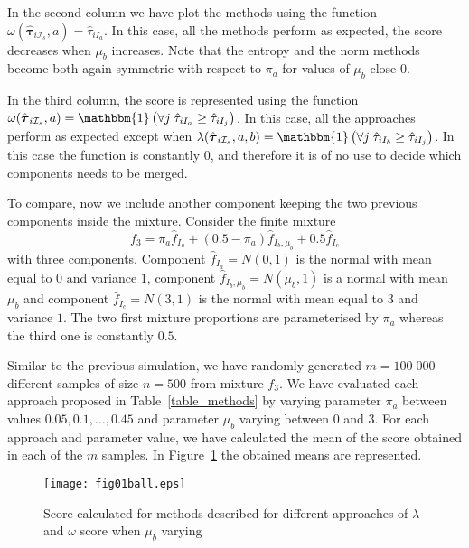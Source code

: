 \documentclass[10pt, a4paper]{article}
\newcommand{\m}[1]{\boldsymbol{#1}}
\begin{document}
In the second column we have plot the methods using the function $\omega(\hat{\m \tau}_{i \mathcal{I}_s}, a) = \hat{\tau}_{iI_a}$. In this case, all the methods perform as expected, the score decreases when $\mu_b$ increases. Note that the entropy and the norm methods become both again symmetric with respect to $\pi_a$ for values of $\mu_b$ close $0$.

In the third column, the score is represented using the function $\omega(\hat{\m \tau}_{i \mathcal{I}_s}, a) = \mathbbm{1}\left( \forall j\; \hat{\tau}_{i I_{a}} \geq \hat{\tau}_{iI_j} \right)$. In this case, all the approaches perform as expected except when $\lambda(\hat{\m \tau}_{i \mathcal{I}_s}, a, b) = \mathbbm{1}\left( \forall j\; \hat{\tau}_{i I_{b}} \geq \hat{\tau}_{iI_j} \right)$. In this case the function is constantly $0$, and therefore it is of no use to decide which components needs to be merged.


To compare, now we include another component keeping the two previous components inside the mixture. Consider the finite mixture
\begin{equation}\label{three_mixture}
f_3 = \pi_a \hat{f}_{I_a} + (0.5 - \pi_a) \hat{f}_{I_b, \mu_b} + 0.5 \hat{f}_{I_c}
\end{equation}
with three components. Component $\hat{f}_{I_a} = N(0, 1)$ is the normal with mean equal to $0$ and variance $1$, component $\hat{f}_{I_b, \mu_b} = N(\mu_b, 1)$ is a normal with mean $\mu_b$ and component $\hat{f}_{I_c} = N(3, 1)$ is the normal with mean equal to $3$ and variance $1$. The two first mixture proportions are parameterised by $\pi_a$ whereas the third one is constantly $0.5$.

Similar to the previous simulation, we have  randomly generated $m=100\;000$ different samples of size $n=500$ from mixture $f_3$. We have evaluated each approach proposed in Table~\ref{table_methods} by varying parameter $\pi_a$ between values $0.05, 0.1, \dots, 0.45$ and parameter $\mu_b$ varying between $0$ and $3$. For each approach and parameter value, we have calculated the mean of the score obtained in each of the $m$ samples. In Figure~\ref{fig:mu_varying3} the obtained means are represented.

\begin{figure}[!t]
\centering
\texttt{[image: fig01ball.eps]}
\caption{Score calculated for methods described for different approaches of $\lambda$ and $\omega$ score when $\mu_b$ varying}
\label{fig:mu_varying3}
\end{figure}
\end{document}
